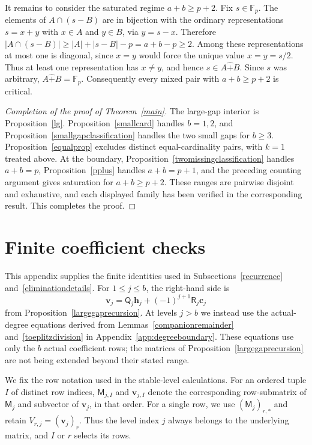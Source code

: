 \documentclass[12pt]{article}
\theoremstyle{remark}
\newcommand{\F}{\mathbb{F}_p}
\newcommand{\rs}{\mathbin{\widehat+}}
\begin{document}
It remains to consider the saturated regime $a+b\ge p+2$.
Fix $s\in\F$.  The elements of $A\cap(s-B)$ are in bijection with the
ordinary representations $s=x+y$ with $x\in A$ and $y\in B$, via
$y=s-x$.  Therefore $|A\cap(s-B)|\ge |A|+|s-B|-p=a+b-p\ge2$.
Among these representations at most one is diagonal, since $x=y$ would
force the unique value $x=y=s/2$.  Thus at least one representation has
$x\ne y$, and hence $s\in A\rs B$.  Since $s$ was arbitrary,
$A\rs B=\F$.  Consequently every mixed pair with $a+b\ge p+2$ is critical.

\begin{proof}[Completion of the proof of Theorem~\ref{main}]
The large-gap interior is Proposition~\ref{lg}.  Proposition~\ref{smallcard}
handles $b=1,2$, and Proposition~\ref{smallgapclassification} handles
the two small gaps for $b\ge3$.  Proposition~\ref{equalprop} excludes
distinct equal-cardinality pairs, with $k=1$ treated above.  At the
boundary, Proposition~\ref{twomissingclassification} handles $a+b=p$,
Proposition~\ref{pplus} handles $a+b=p+1$, and the preceding counting
argument gives saturation for $a+b\ge p+2$.  These ranges are pairwise
disjoint and exhaustive, and each displayed family has been verified in
the corresponding result.  This completes the proof.
\end{proof}

\appendix
\section{Finite coefficient checks}\label{app:finitechecks}

This appendix supplies the finite identities used in
Subsections~\ref{recurrence} and~\ref{eliminationdetails}.  For
$1\le j\le b$, the right-hand side is
\[
 \mathbf v_j=\mathsf Q_j\mathbf h_j+(-1)^{j+1}\mathsf R_j\mathbf c_j
\]
from Proposition~\ref{largegaprecursion}.  At levels $j>b$ we instead
use the actual-degree equations derived from
Lemmas~\ref{companionremainder} and~\ref{toeplitzdivision} in
Appendix~\ref{app:degreeboundary}.  These equations use only the $b$ actual coefficient rows; the matrices of Proposition~\ref{largegaprecursion}
are not being extended beyond their stated range.

We fix the row notation used in the stable-level calculations.  For an
ordered tuple $I$ of distinct row indices, $\mathsf M_{j,I}$ and
$\mathbf v_{j,I}$ denote the corresponding row-submatrix of
$\mathsf M_j$ and subvector of $\mathbf v_j$, in that order.
For a single row, we use $(\mathsf M_j)_{r,*}$ and retain
$V_{r,j}=(\mathbf v_j)_r$.  Thus the level index $j$ always belongs
to the underlying matrix, and $I$ or $r$ selects its rows.
\end{document}
